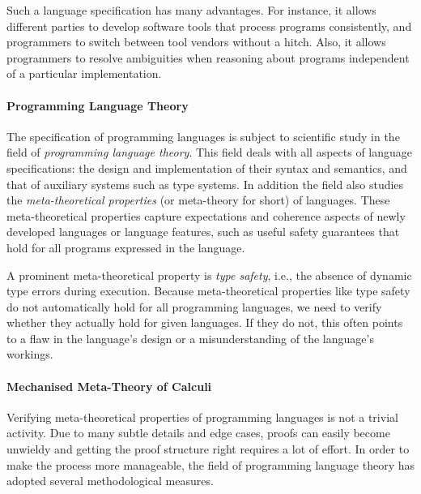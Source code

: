 {%

Such a language specification has many advantages. For instance, it allows
different parties to develop software tools that process programs consistently,
and programmers to switch between tool vendors without a hitch.  Also, it allows
programmers to resolve ambiguities when reasoning about programs independent of
a particular implementation.


\paragraph{Programming Language Theory}
The specification of programming languages is subject to scientific study in the
field of \emph{programming language theory}. This field deals with all aspects
of language specifications: the design and implementation of their syntax and
semantics, and that of auxiliary systems such as type systems. In addition the
field also studies the \emph{meta-theoretical properties} (or meta-theory for
short) of languages. These meta-theoretical properties capture expectations and
coherence aspects of newly developed languages or language features, such as
useful safety guarantees that hold for all programs expressed in the language.

A prominent meta-theoretical property is \emph{type safety}, i.e., the absence
of dynamic type errors during execution. Because meta-theoretical properties
like type safety do not automatically hold for all programming languages, we
need to verify whether they actually hold for given languages. If they do not,
this often points to a flaw in the language's design or a misunderstanding of
the language's workings.

\paragraph{Mechanised Meta-Theory of Calculi}
Verifying meta-theoretical properties of programming languages is not a trivial
activity. Due to many subtle details and edge cases, proofs can easily become
unwieldy and getting the proof structure right requires a lot of effort. In
order to make the process more manageable, the field of programming language
theory has adopted several methodological measures.

}

